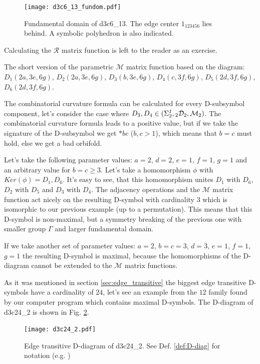 \documentclass[12pt,a4paper]{article}
\numberwithin{equation}{section}
\newcommand{\leftsub}[2]{{\vphantom{#2}}_{#1}{#2}}
\theoremstyle{plain}%
\theoremstyle{definition}
\theoremstyle{remark}
\begin{document}
\begin{figure}
  \caption{\label{fig:d3c6_13_fundom} Fundamental domain of d3c6\_13. The edge
  center $1_{123456}$ lies behind. A symbolic polyhedron is also indicated.}
  \center
  \texttt{[image: d3c6\_13\_fundom.pdf]}
\end{figure}

Calculating the $\mathcal{R}$ matrix function is left to the reader as an
exercise.

The short version of the parametric $\mathcal{M}$ matrix function based on the
diagram: $D_1(2a, 3e, 6g)$, $D_2(2a, 3e, 6g)$, $D_3(b, 3e, 6g)$, $D_4(c, 3f,
6g)$, $D_5(2d, 3f, 6g)$, $D_6(2d, 3f, 6g)$.

The combinatorial curvature formula can be calculated for every D-subsymbol
component,
let's consider the case where
$D_3,D_4\in(\Sigma^I_2,\leftsub{2}{\mathcal{D}}_2,\mathcal{M}_2)$. The combinatorial
curvature formula leads to a positive value, but if we take the signature of
the D-subsymbol we get $*bc$ ($b,c>1$), which means that $b=c$ must hold, else
we get a bad orbifold.

Let's take the following parameter values: $a=2$, $d=2$, $e=1$, $f=1$, $g=1$ and
an arbitrary value for $b=c\geq3$. Let's take a homomorphism $\phi$ with
$Ker(\phi)={D_1,D_6}$. It's easy to see, that this homomorphism unites $D_1$
with $D_6$, $D_2$ with $D_5$ and $D_3$ with $D_4$. The adjacency operations and
the $\mathcal{M}$ matrix function act nicely on the resulting D-symbol
with cardinality $3$ which is isomorphic to our previous example (up to a
permutation). This means that this D-symbol is non-maximal, but a symmetry
breaking of the previous one with smaller group $\Gamma$ and larger fundamental
domain.

If we take another set of parameter values: $a=2$, $b=c=3$, $d=3$, $e=1$,
$f=1$, $g=1$ the resulting D-symbol is maximal, because the homomorphisms of the
D-diagram cannot be extended to the $\mathcal{M}$ matrix functions.

As it was mentioned in section \ref{sec:edge_transitive} the biggest edge
transitive D-symbols have a cardinality of $24$, let's see an example from the
$12$ family found by our computer program which contains maximal D-symbols.
The D-diagram of d3c24\_2 is shown in Fig. \ref{fig:d3c24_2}.

\begin{figure}
  \caption{\label{fig:d3c24_2} Edge transitive D-diagram of d3c24\_2. See
  Def. \ref{def:D-diag} for notation (e.g. \usebox{\LegendBody})}
  \center
  \texttt{[image: d3c24\_2.pdf]}
\end{figure}
\end{document}
